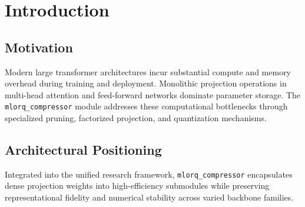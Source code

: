 \section{Introduction}

\subsection{Motivation}
Modern large transformer architectures incur substantial compute and memory overhead during training and deployment. Monolithic projection operations in multi-head attention and feed-forward networks dominate parameter storage. The \texttt{mlorq_compressor} module addresses these computational bottlenecks through specialized pruning, factorized projection, and quantization mechanisms.

\subsection{Architectural Positioning}
Integrated into the unified research framework, \texttt{mlorq_compressor} encapsulates dense projection weights into high-efficiency submodules while preserving representational fidelity and numerical stability across varied backbone families.
